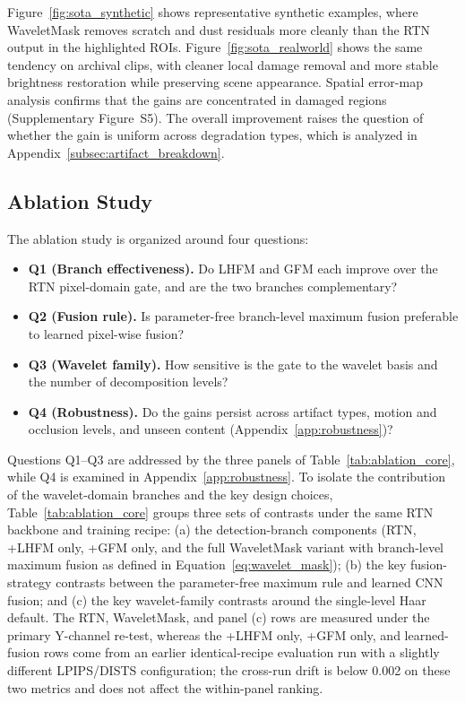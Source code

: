 Figure~\ref{fig:sota_synthetic} shows representative synthetic examples, where WaveletMask removes scratch and dust residuals more cleanly than the RTN output in the highlighted ROIs. Figure~\ref{fig:sota_realworld} shows the same tendency on archival clips, with cleaner local damage removal and more stable brightness restoration while preserving scene appearance. Spatial error-map analysis confirms that the gains are concentrated in damaged regions (Supplementary Figure~S5). The overall improvement raises the question of whether the gain is uniform across degradation types, which is analyzed in Appendix~\ref{subsec:artifact_breakdown}.

\subsection{Ablation Study}\label{subsec:ablation}

The ablation study is organized around four questions:
\begin{itemize}
\item \textbf{Q1 (Branch effectiveness).} Do LHFM and GFM each improve over the RTN pixel-domain gate, and are the two branches complementary?
\item \textbf{Q2 (Fusion rule).} Is parameter-free branch-level maximum fusion preferable to learned pixel-wise fusion?
\item \textbf{Q3 (Wavelet family).} How sensitive is the gate to the wavelet basis and the number of decomposition levels?
\item \textbf{Q4 (Robustness).} Do the gains persist across artifact types, motion and occlusion levels, and unseen content (Appendix~\ref{app:robustness})?
\end{itemize}

Questions Q1--Q3 are addressed by the three panels of Table~\ref{tab:ablation_core}, while Q4 is examined in Appendix~\ref{app:robustness}. To isolate the contribution of the wavelet-domain branches and the key design choices, Table~\ref{tab:ablation_core} groups three sets of contrasts under the same RTN backbone and training recipe: (a) the detection-branch components (RTN, +LHFM only, +GFM only, and the full WaveletMask variant with branch-level maximum fusion as defined in Equation~\eqref{eq:wavelet_mask}); (b) the key fusion-strategy contrasts between the parameter-free maximum rule and learned CNN fusion; and (c) the key wavelet-family contrasts around the single-level Haar default. The RTN, WaveletMask, and panel (c) rows are measured under the primary Y-channel re-test, whereas the +LHFM only, +GFM only, and learned-fusion rows come from an earlier identical-recipe evaluation run with a slightly different LPIPS/DISTS configuration; the cross-run drift is below 0.002 on these two metrics and does not affect the within-panel ranking.

